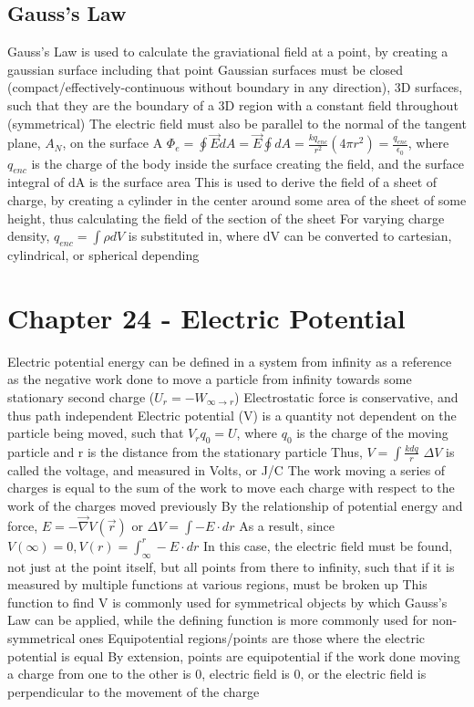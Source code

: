 \documentclass[11 pt, twoside]{article}
\newenvironment{outline*}
{
	\begin{outline}[enumerate]
	}
	{\end{outline}
}
\begin{document}
\subsection{Gauss's Law}
\begin{outline*}
\1 Gauss’s Law is used to calculate the graviational field at a point, by creating a gaussian surface including that point
\2 Gaussian surfaces must be closed (compact/effectively-continuous without boundary in any direction), 3D surfaces, such that they are the boundary of a 3D region with a constant field throughout (symmetrical)
\2 The electric field must also be parallel to the normal of the tangent plane, $A_N$, on the surface A
\2 $\Phi_e = \oint \vec{E} dA = \vec{E} \oint dA = \frac{kq_{enc}}{r^2} (4\pi r^2) = \frac{q_{enc}}{\epsilon_0}$, where $q_{enc}$ is the charge of the body inside the surface creating the field, and the surface integral of dA is the surface area
\1 This is used to derive the field of a sheet of charge, by creating a cylinder in the center around some area of the sheet of some height, thus calculating the field of the section of the sheet
\1 For varying charge density, $q_{enc} = \int \rho dV$ is substituted in, where dV can be converted to cartesian, cylindrical, or spherical depending
\end{outline*}
\section{Chapter 24 - Electric Potential}
\begin{outline*}
\1 Electric potential energy can be defined in a system from infinity as a reference as the negative work done to move a particle from infinity towards some stationary second charge ($U_r = -W_{\infty \to r}$)
\2 Electrostatic force is conservative, and thus path independent
\2 Electric potential (V) is a quantity not dependent on the particle being moved, such that $V_rq_0 = U$, where $q_0$ is the charge of the moving particle and r is the distance from the stationary particle
\2 Thus, $V = \int \frac{kdq}{r}$
\2 $\Delta V$ is called the voltage, and measured in Volts, or J/C
\1 The work moving a series of charges is equal to the sum of the work to move each charge with respect to the work of the charges moved previously
\1 By the relationship of potential energy and force, $E = -\vec{\nabla} V(\vec{r})$ or $\Delta V = \int -E \cdot dr$
\2 As a result, since $V(\infty) = 0, V(r) = \int^r_\infty -E \cdot dr$
\2 In this case, the electric field must be found, not just at the point itself, but all points from there to infinity, such that if it is measured by multiple functions at various regions, must be broken up
\2 This function to find V is commonly used for symmetrical objects by which Gauss's Law can be applied, while the defining function is more commonly used for non-symmetrical ones
\1 Equipotential regions/points are those where the electric potential is equal
\2 By extension, points are equipotential if the work done moving a charge from one to the other is 0, electric field is 0, or the electric field is perpendicular to the movement of the charge
\end{outline*}
\end{document}
